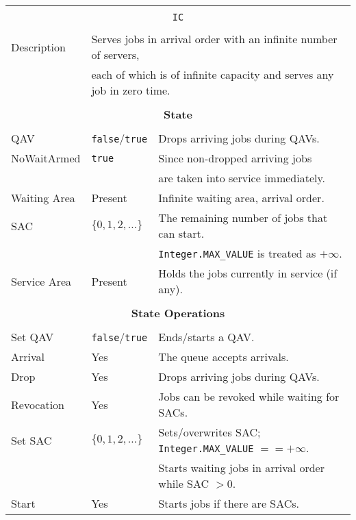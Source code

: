 \documentclass[12pt]{book}
\begin{document}
\begin{tabular}{|l|l|l|}
\hline
\multicolumn{3}{|c|}{} \\
\multicolumn{3}{|c|}{\lstinline[basicstyle=\large]{IC}} \\
\multicolumn{3}{|c|}{} \\
\hline
Description & \multicolumn{2}{|l|}{Serves jobs in arrival order with an infinite number of servers,} \\
            & \multicolumn{2}{|l|}{each of which is of infinite capacity and serves any job in zero time.} \\
\hline
\multicolumn{3}{|c|}{} \\
\multicolumn{3}{|c|}{\bf State} \\
\multicolumn{3}{|c|}{} \\
\hline
QAV & \lstinline|false|/\lstinline|true| & Drops arriving jobs during QAVs. \\
\hline
NoWaitArmed & \lstinline|true| & Since non-dropped arriving jobs \\
            &                  & are taken into service immediately. \\
\hline
Waiting Area & Present & Infinite waiting area, arrival order. \\
\hline
SAC & $\{0, 1, 2, \ldots\}$ & The remaining number of jobs that can start. \\
    &                       & \lstinline|Integer.MAX_VALUE| is treated as $+\infty$. \\
\hline
Service Area & Present & Holds the jobs currently in service (if any). \\
\hline
\multicolumn{3}{|c|}{} \\
\multicolumn{3}{|c|}{\bf State Operations} \\
\multicolumn{3}{|c|}{} \\
\hline
Set QAV & \lstinline|false|/\lstinline|true| & Ends/starts a QAV. \\
\hline
Arrival & Yes & The queue accepts arrivals. \\
\hline
Drop & Yes & Drops arriving jobs during QAVs. \\
\hline
Revocation & Yes & Jobs can be revoked while waiting for SACs. \\
\hline
Set SAC & $\{0, 1, 2, \ldots\}$ & Sets/overwrites SAC; \lstinline|Integer.MAX_VALUE| $== +\infty$. \\
        &                       & Starts waiting jobs in arrival order while SAC $> 0$. \\
\hline
Start & Yes & Starts jobs if there are SACs. \\

\end{tabular}
\end{document}
